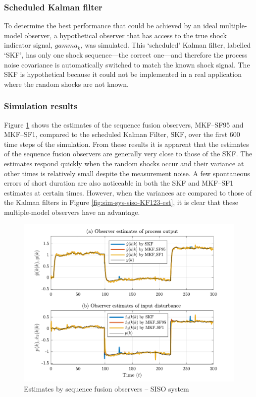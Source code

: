 \subsubsection{Scheduled Kalman filter} \label{sec:sim-obs-lin-1-SKF}

To determine the best performance that could be achieved by an ideal multiple-model observer, a hypothetical observer that has access to the true shock indicator signal, $gamma_k$, was simulated. This `scheduled' Kalman filter, labelled ‘SKF’, has only one shock sequence---the correct one---and therefore the process noise covariance is automatically switched to match the known shock signal. The \gls{SKF} is hypothetical because it could not be implemented in a real application where the random shocks are not known.

\subsubsection{Simulation results} \label{sec:sim-obs-lin-1-results}

Figure \ref{fig:rod-obs-sim1-yest-1-SF} shows the estimates of the sequence fusion observers, MKF--SF95 and MKF--SF1, compared to the scheduled Kalman Filter, \gls{SKF}, over the first 600 time steps of the simulation. From these results it is apparent that the estimates of the sequence fusion observers are generally very close to those of the \gls{SKF}. The estimates respond quickly when the random shocks occur and their variance at other times is relatively small despite the measurement noise. A few spontaneous errors of short duration are also noticeable in both the \gls{SKF} and MKF--SF1 estimates at certain times. However, when the variances are compared to those of the Kalman filters in Figure \ref{fig:sim-sys-siso-KF123-est}, it is clear that these multiple-model observers have an advantage.
\begin{figure}[htp]
	\centering
	\includegraphics[width=13cm]{images/rod_obs_sim1_all_seed_y_est1_SF95_SF1.pdf}
	\caption{Estimates by sequence fusion observers – \gls{SISO} system}
	\label{fig:rod-obs-sim1-yest-1-SF}
\end{figure}

